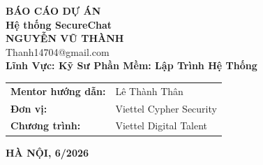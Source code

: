 \begin{titlepage}
    \begin{center}
        \vspace*{1.5cm}
        
        {\Huge \textbf{BÁO CÁO DỰ ÁN}}\\[2cm]
        
        {\Large \textbf{Hệ thống SecureChat}}\\[2cm]
        
        {\large \textbf{NGUYỄN VŨ THÀNH}}\\
        {\normalsize Thanh14704@gmail.com}\\[1.5cm]
        
        {\large \textbf{Lĩnh Vực: Kỹ Sư Phần Mềm: Lập Trình Hệ Thống}}\\[3cm]
        
        \large
        \renewcommand{\arraystretch}{1.5}
        \begin{tabular}{ll}
            \textbf{Mentor hướng dẫn:} & Lê Thành Thân \\
            \textbf{Đơn vị:} & Viettel Cypher Security \\
            \textbf{Chương trình:} & Viettel Digital Talent \\
        \end{tabular}
        
        \vfill
        {\large \textbf{HÀ NỘI, 6/2026}}
        \vspace*{1.5cm}
    \end{center}
\end{titlepage}
